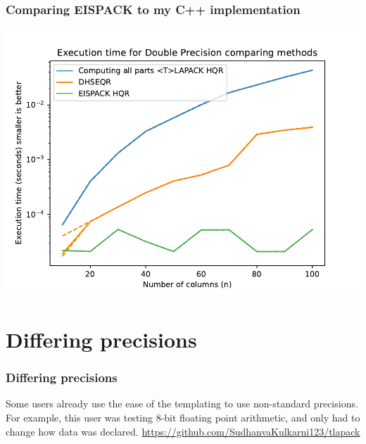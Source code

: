 \documentclass[12pt]{beamer}
\begin{document}
    \begin{frame}
        \frametitle{Comparing EISPACK to my C++ implementation}
        \includegraphics[width=\textwidth]{numericalExperiments/combinedTimeResultsAll.pdf}
    \end{frame}
    \section{Differing precisions}
    \begin{frame}
        \frametitle{Differing precisions}
        Some users already use the ease of the templating to use non-standard precisions. For example, this
        user was testing 8-bit floating point arithmetic, and only had to change how data was declared.
        \url{https://github.com/SudhanvaKulkarni123/tlapack}
    \end{frame}
\end{document}
